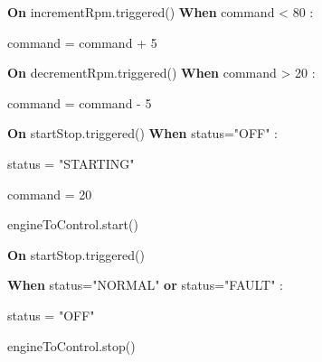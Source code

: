 \documentclass[11pt]{article} %
\begin{document}
\indent\indent\indent\textbf{On} incrementRpm.triggered() \textbf{When} command < 80 :

    \indent\indent\indent\indent command = command + 5

\indent\indent\indent\textbf{On} decrementRpm.triggered() \textbf{When} command > 20 :

    \indent\indent\indent\indent command = command - 5

\indent\indent\indent\textbf{On} startStop.triggered() \textbf{When} status="OFF" :

    \indent\indent\indent\indent status = "STARTING"

    \indent\indent\indent\indent command = 20

    \indent\indent\indent\indent engineToControl.start()

\indent\indent\indent \textbf{On} startStop.triggered() 

\indent\indent\indent \indent\indent\indent \textbf{When}  status="NORMAL" \textbf{or} status="FAULT"  :

    \indent\indent\indent\indent status = "OFF"

    \indent\indent\indent\indent engineToControl.stop()
\end{document}
